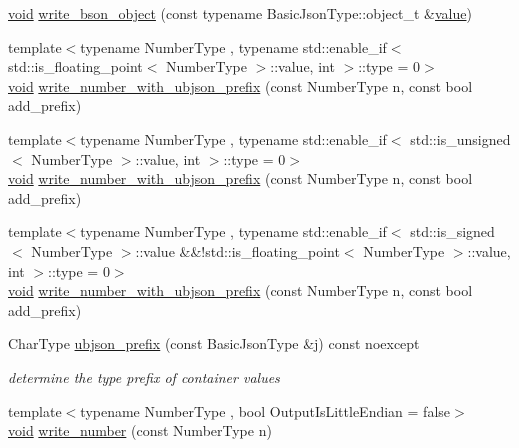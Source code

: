 \begin{DoxyCompactItemize}
\hyperlink{namespacenlohmann_1_1detail_a59fca69799f6b9e366710cb9043aa77d}{void} \hyperlink{classnlohmann_1_1detail_1_1binary__writer_a29b3e0f83a8e5f2307804023109ba2c9}{write\+\_\+bson\+\_\+object} (const typename Basic\+Json\+Type\+::object\+\_\+t \&\hyperlink{namespacenlohmann_1_1detail_a2fb6dae6578e06ae73ca0d7cc8512b1aa2063c1608d6e0baf80249c42e2be5804}{value})
\item 
{\footnotesize template$<$typename Number\+Type , typename std\+::enable\+\_\+if$<$ std\+::is\+\_\+floating\+\_\+point$<$ Number\+Type $>$\+::value, int $>$\+::type  = 0$>$ }\\\hyperlink{namespacenlohmann_1_1detail_a59fca69799f6b9e366710cb9043aa77d}{void} \hyperlink{classnlohmann_1_1detail_1_1binary__writer_a0ea6745f944c0c61672146886b4ee90f}{write\+\_\+number\+\_\+with\+\_\+ubjson\+\_\+prefix} (const Number\+Type n, const bool add\+\_\+prefix)
\item 
{\footnotesize template$<$typename Number\+Type , typename std\+::enable\+\_\+if$<$ std\+::is\+\_\+unsigned$<$ Number\+Type $>$\+::value, int $>$\+::type  = 0$>$ }\\\hyperlink{namespacenlohmann_1_1detail_a59fca69799f6b9e366710cb9043aa77d}{void} \hyperlink{classnlohmann_1_1detail_1_1binary__writer_a0ea6745f944c0c61672146886b4ee90f}{write\+\_\+number\+\_\+with\+\_\+ubjson\+\_\+prefix} (const Number\+Type n, const bool add\+\_\+prefix)
\item 
{\footnotesize template$<$typename Number\+Type , typename std\+::enable\+\_\+if$<$ std\+::is\+\_\+signed$<$ Number\+Type $>$\+::value \&\&!std\+::is\+\_\+floating\+\_\+point$<$ Number\+Type $>$\+::value, int $>$\+::type  = 0$>$ }\\\hyperlink{namespacenlohmann_1_1detail_a59fca69799f6b9e366710cb9043aa77d}{void} \hyperlink{classnlohmann_1_1detail_1_1binary__writer_a0ea6745f944c0c61672146886b4ee90f}{write\+\_\+number\+\_\+with\+\_\+ubjson\+\_\+prefix} (const Number\+Type n, const bool add\+\_\+prefix)
\item 
Char\+Type \hyperlink{classnlohmann_1_1detail_1_1binary__writer_a4c129249a5aee8e4ec8add6c6184e4f7}{ubjson\+\_\+prefix} (const Basic\+Json\+Type \&j) const noexcept
\begin{DoxyCompactList}\small\item\em determine the type prefix of container values \end{DoxyCompactList}\item 
{\footnotesize template$<$typename Number\+Type , bool Output\+Is\+Little\+Endian = false$>$ }\\\hyperlink{namespacenlohmann_1_1detail_a59fca69799f6b9e366710cb9043aa77d}{void} \hyperlink{classnlohmann_1_1detail_1_1binary__writer_a6e11b7227fcecc25a548ed45507b7d1c}{write\+\_\+number} (const Number\+Type n)

\end{DoxyCompactItemize}
